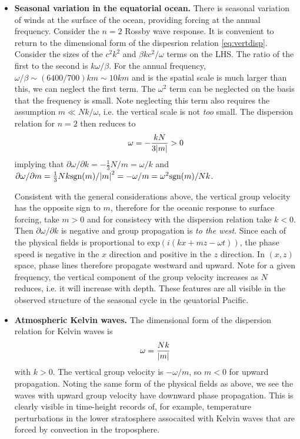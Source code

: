 \documentclass{jknotes}
\begin{document}
\begin{eg}
	\hspace{.5em}
	\begin{itemize}
		\item \textbf{Seasonal variation in the equatorial ocean.} There is
			seasonal variation of winds at the surface of the ocean, providing
			forcing at the annual frequency. Consider the $n=2$ Rossby wave
			response. It is convenient to return to the dimensional form of
			the dispesrion relation \eqref{eq:vertdisp}. Consider the sizes of
			the $c^2k^2$ and $\beta kc^2/\omega$ terms on the LHS. The ratio
			of the first to the second is $k\omega/\beta$. For the annual
			frequency, $\omega/\beta \sim (6400/700) km \sim 10 km$ and is the
			spatial scale is much larger than this, we can neglect the first
			term. The $\omega^2$ term can be neglected on the basis that the
			frequency is small. Note neglecting this term also requires the
			assumption $m \ll Nk/\omega$, i.e. the vertical scale is not
			\emph{too} small. The dispersion relation for $n=2$ then reduces to
			\begin{equation}
				\omega = -\frac{kN}{3\abs{m}} > 0
			\end{equation}
			implying that $\partial \omega/\partial k = -\frac{1}{3}N/m= \omega/k$ and
			$\partial\omega/\partial m = \frac{1}{3}Nk\text{sgn}(m)/\abs{m}^2
			= -\omega/m = \omega^2 \text{sgn}(m)/Nk$.

			Consistent with the general considerations above, the vertical
			group velocity has the opposite sign to $m$, therefore for the oceanic
			response to surface forcing, take $m > 0$ and for consistecy with
			the dispersion relation take $k < 0$. Then $\partial
			\omega/\partial k$ is negative and group propagation is \emph{to
			the west}. Since each of the physical fields is proportional to
			$\text{exp}(i(kx+mz-\omega t))$, the phase speed is negative in
			the $x$ direction and positive in the $z$ direction. In $(x,z)$
			space, phase lines therefore propagate westward and upward. Note
			for a given frequency, the vertical component of the group
			velocity increases as $N$ reduces, i.e. it will increase with
			depth. These features are all visible in the observed structure of
			the seasonal cycle in the qeuatorial Pacific.
		\item \textbf{Atmospheric Kelvin waves.}
			The dimensional form of the dispersion relation for Kelvin waves
			is 
			\begin{equation}
				\omega = \frac{Nk}{\abs{m}}
			\end{equation}
			with $k > 0$. The vertical group velocity is $-\omega/m$, so $m <
			0$ for upward propagation. Noting the same form of the physical
			fields as above, we see the waves with upward group velocity have
			downward phase propagation. This is clearly visible in time-height
			records of, for example, temperature perturbations in the lower
			stratosphere assocaited with Kelvin waves that are forced by
			convection in the troposphere.


\end{itemize}
\end{eg}
\end{document}
